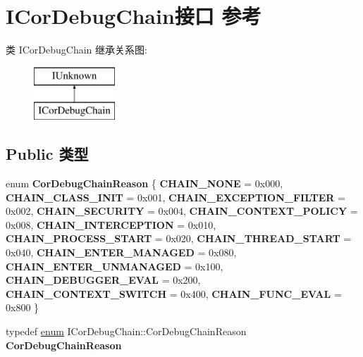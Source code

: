 \hypertarget{interface_i_cor_debug_chain}{}\section{I\+Cor\+Debug\+Chain接口 参考}
\label{interface_i_cor_debug_chain}
类 I\+Cor\+Debug\+Chain 继承关系图\+:\begin{figure}[H]
\begin{center}
\leavevmode
\includegraphics[height=2.000000cm]{interface_i_cor_debug_chain}
\end{center}
\end{figure}
\subsection*{Public 类型}
\begin{DoxyCompactItemize}
\item 
\mbox{\label{interface_i_cor_debug_chain_aa40a97556f2919b458328522498257a3}} 
enum {\bfseries Cor\+Debug\+Chain\+Reason} \{ \newline
{\bfseries C\+H\+A\+I\+N\+\_\+\+N\+O\+NE} = 0x000, 
{\bfseries C\+H\+A\+I\+N\+\_\+\+C\+L\+A\+S\+S\+\_\+\+I\+N\+IT} = 0x001, 
{\bfseries C\+H\+A\+I\+N\+\_\+\+E\+X\+C\+E\+P\+T\+I\+O\+N\+\_\+\+F\+I\+L\+T\+ER} = 0x002, 
{\bfseries C\+H\+A\+I\+N\+\_\+\+S\+E\+C\+U\+R\+I\+TY} = 0x004, 
\newline
{\bfseries C\+H\+A\+I\+N\+\_\+\+C\+O\+N\+T\+E\+X\+T\+\_\+\+P\+O\+L\+I\+CY} = 0x008, 
{\bfseries C\+H\+A\+I\+N\+\_\+\+I\+N\+T\+E\+R\+C\+E\+P\+T\+I\+ON} = 0x010, 
{\bfseries C\+H\+A\+I\+N\+\_\+\+P\+R\+O\+C\+E\+S\+S\+\_\+\+S\+T\+A\+RT} = 0x020, 
{\bfseries C\+H\+A\+I\+N\+\_\+\+T\+H\+R\+E\+A\+D\+\_\+\+S\+T\+A\+RT} = 0x040, 
\newline
{\bfseries C\+H\+A\+I\+N\+\_\+\+E\+N\+T\+E\+R\+\_\+\+M\+A\+N\+A\+G\+ED} = 0x080, 
{\bfseries C\+H\+A\+I\+N\+\_\+\+E\+N\+T\+E\+R\+\_\+\+U\+N\+M\+A\+N\+A\+G\+ED} = 0x100, 
{\bfseries C\+H\+A\+I\+N\+\_\+\+D\+E\+B\+U\+G\+G\+E\+R\+\_\+\+E\+V\+AL} = 0x200, 
{\bfseries C\+H\+A\+I\+N\+\_\+\+C\+O\+N\+T\+E\+X\+T\+\_\+\+S\+W\+I\+T\+CH} = 0x400, 
\newline
{\bfseries C\+H\+A\+I\+N\+\_\+\+F\+U\+N\+C\+\_\+\+E\+V\+AL} = 0x800
 \}
\item 
\mbox{\label{interface_i_cor_debug_chain_a68d47cab5a3b1b6f62d8519575db3e02}} 
typedef \hyperlink{interfaceenum}{enum} I\+Cor\+Debug\+Chain\+::\+Cor\+Debug\+Chain\+Reason {\bfseries Cor\+Debug\+Chain\+Reason}
\end{DoxyCompactItemize}
